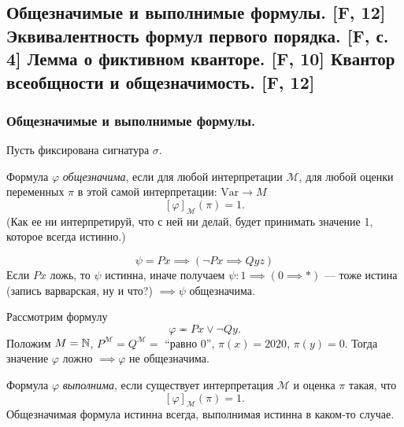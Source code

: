 \documentclass[a4paper, fleqn]{article}
\begin{document}
    \subsection{Общезначимые и выполнимые формулы. [F, 12] Эквивалентность формул первого порядка. [F, с. 4] Лемма о фиктивном кванторе. [F, 10] Квантор всеобщности и общезначимость. [F, 12]}
    
    \subsubsection{Общезначимые и выполнимые формулы.}

    Пусть фиксирована сигнатура $\sigma$. 
    \begin{definition}
        Формула $\varphi$ {\it общезначима}, если для любой интерпретации $\mathcal{M}$, для 
        любой оценки переменных $\pi$ в этой самой интерпретации: $\text{Var} \to M$ 
        \[
            [\varphi]_{\mathcal{M}}(\pi) = 1.
        \]
        (Как ее ни интерпретируй, что с ней ни делай, будет принимать значение 1, 
        которое всегда истинно.)
    \end{definition}

    \begin{example}
        \[
            \psi = Px \implies (\neg Px \implies Qyz)
        \]
        Если $Px$ ложь, то $\psi$ истинна, иначе получаем $\psi \colon 1 \implies 
        (0 \implies *)$ --- тоже истина (запись варварская, ну и что?) $\implies 
        \psi $ общезначима. 
    \end{example}
    \begin{example}
        Рассмотрим формулу
        \[
            \varphi \eqcirc Px \lor \neg Qy.
        \]
        Положим $M = \mathbb{N}$, $P^{\mathcal{M}} = Q^{\mathcal{M}} =$ 
        ``равно 0'', $\pi(x) = 2020$, $\pi(y) = 0$.
        Тогда значение $\varphi$ ложно $ \implies \varphi $ не общезначима.
    \end{example}

    \begin{definition}
        Формула $\varphi$ {\it выполнима}, если существует интерпретация $\mathcal{M}$ 
        и оценка $\pi$ такая, что
        \[
            [\varphi]_{\mathcal{M}}(\pi) = 1.
        \]
        Общезначимая формула истинна всегда, выполнимая истинна в каком-то случае.
    \end{definition}
        
\end{document}
